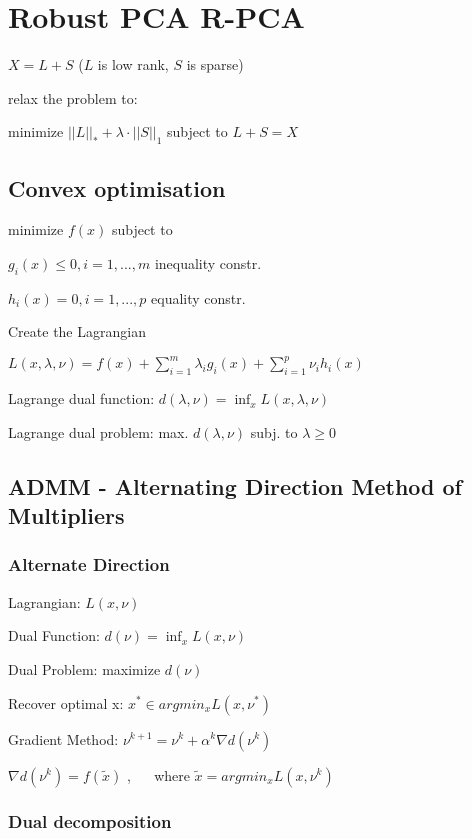 \documentclass[11pt,twocolumn]{article}
\begin{document}
\section{Robust PCA R-PCA}
$X = L + S$  ($L$ is low rank, $S$ is sparse)

relax the problem to:

minimize 	$||L||_* + \lambda \cdot ||S||_1$
subject to 	$L+S = X$

\subsection{Convex optimisation}

minimize $f(x)$ subject to 

$g_i(x) \leq 0, i = 1,...,m$ inequality constr.

$h_i(x) = 0, i = 1,...,p$ equality constr.

Create the Lagrangian

$L(x, \lambda, \nu) = f(x) + \sum_{i=1}^m{\lambda_i g_i(x) + \sum_{i=1}^p{\nu_i h_i(x)}}$

Lagrange dual function: $ d(\lambda, \nu) = \inf_{x} L (x,\lambda, \nu) $

Lagrange dual problem: max. $d(\lambda, \nu)$  subj. to $\lambda \geq 0$

\subsection{ADMM - Alternating Direction Method of Multipliers}


\subsubsection{Alternate Direction}


Lagrangian: $L(x,\nu)$

Dual Function: $d(\nu)=\inf_x L(x,\nu)$

Dual Problem: maximize $d(\nu)$

Recover optimal x: $x^* \in argmin_x L(x, \nu^*)$

Gradient Method: $\nu^{k+1} = \nu^k + \alpha^k \nabla d(\nu^k)$

$\nabla  d (\nu^k) = f(\tilde{x})$ , ~~ where
$\tilde{x} = argmin_x L(x, \nu^k)$

\subsubsection{Dual decomposition}
\end{document}
